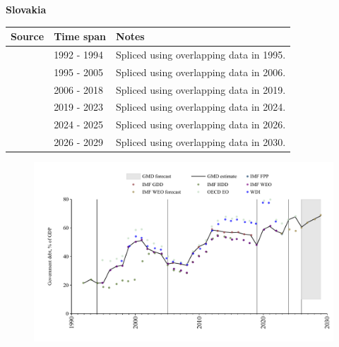 \documentclass[12pt,a4paper,landscape]{article}
\begin{document}
\begin{adjustbox}{max totalsize={\paperwidth}{\paperheight},center}
\begin{minipage}[t][\textheight][t]{\textwidth}
\vspace*{0.5cm}
{}
\begin{center}
{\Large\bfseries Slovakia}
\end{center}
\vspace{0.5cm}
\begin{table}[H]
\centering
\small
\begin{tabular}{|l|l|l|}
\hline
\textbf{Source} & \textbf{Time span} & \textbf{Notes} \\
\hline
\rowcolor{white}\cite{IMF_HDD}& 1992 - 1994 &Spliced using overlapping data in 1995.\\
\rowcolor{lightgray}\cite{IMF_FPP}& 1995 - 2005 &Spliced using overlapping data in 2006.\\
\rowcolor{white}\cite{IMF_GDD}& 2006 - 2018 &Spliced using overlapping data in 2019.\\
\rowcolor{lightgray}\cite{IMF_FPP}& 2019 - 2023 &Spliced using overlapping data in 2024.\\
\rowcolor{white}\cite{OECD_EO}& 2024 - 2025 &Spliced using overlapping data in 2026.\\
\rowcolor{lightgray}\cite{IMF_WEO_forecast}& 2026 - 2029 &Spliced using overlapping data in 2030.\\
\hline
\end{tabular}
\end{table}
\begin{figure}[H]
\centering
\includegraphics[width=\textwidth,height=0.6\textheight,keepaspectratio]{graphs/SVK_govdebt_GDP.pdf}
\end{figure}
\end{minipage}
\end{adjustbox}
\end{document}
